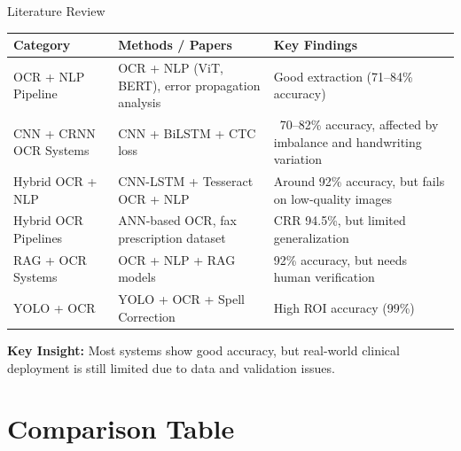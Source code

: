 \documentclass[11pt,aspectratio=169]{beamer}
\begin{document}
\begin{frame}{Literature Review}
\small

\centering
\renewcommand{\arraystretch}{1.2}

\begin{tabular}{|m{3.2cm}|m{5.2cm}|m{5cm}|}
\hline

\rowcolor{medixPrimary}
\color{white}\textbf{Category} &
\color{white}\textbf{Methods / Papers} &
\color{white}\textbf{Key Findings}
\\
\hline

OCR + NLP Pipeline  &
OCR + NLP (ViT, BERT), error propagation analysis &
Good extraction (71--84\% accuracy) \\
\hline

CNN + CRNN OCR Systems &
CNN + BiLSTM + CTC loss &
~70--82\% accuracy, affected by imbalance and handwriting variation \\
\hline

Hybrid OCR + NLP  &
CNN-LSTM + Tesseract OCR + NLP &
Around 92\% accuracy, but fails on low-quality images \\
\hline

Hybrid OCR Pipelines &
ANN-based OCR, fax prescription dataset &
CRR 94.5\%, but limited generalization \\
\hline

RAG + OCR Systems &
OCR + NLP + RAG models &
92\% accuracy, but needs human verification \\
\hline

YOLO + OCR &
YOLO + OCR + Spell Correction &
High ROI accuracy (99\%)\\
\hline

\end{tabular}

\vspace{0.2cm}

\textbf{Key Insight:}
Most systems show good accuracy, but real-world clinical deployment is still limited due to data and validation issues.

\end{frame}





\section{Comparison Table}
\end{document}
